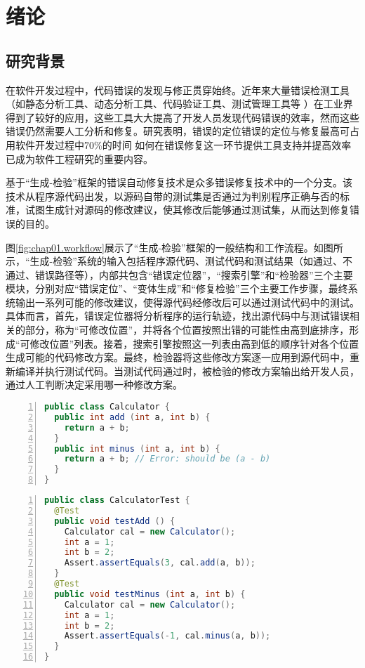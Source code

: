 \chapter{绪论}
\label{cha:intro}

\section{研究背景}%
在软件开发过程中，代码错误的发现与修正贯穿始终。近年来大量错误检测工具（如静态分析工具、动态分析工具、代码验证工具、测试管理工具等%
）在工业界得到了较好的应用，这些工具大大提高了开发人员发现代码错误的效率，然而这些错误仍然需要人工分析和修复。研究表明，错误的定位错误的定位与修复最高可占用软件开发过程中70\%的时间%
如何在错误修复这一环节提供工具支持并提高效率已成为软件工程研究的重要内容。

基于“生成-检验”框架的错误自动修复技术是众多错误修复技术中的一个分支。该技术从程序源代码出发，以源码自带的测试集是否通过为判别程序正确与否的标准，试图生成针对源码的修改建议，使其修改后能够通过测试集，从而达到修复错误的目的。

图\ref{fig:chap01.workflow}展示了“生成-检验”框架的一般结构和工作流程。如图所示，“生成-检验”系统的输入包括程序源代码、测试代码和测试结果（如通过、不通过、错误路径等），内部共包含“错误定位器”，“搜索引擎”和“检验器”三个主要模块，分别对应“错误定位”、“变体生成”和“修复检验”三个主要工作步骤，最终系统输出一系列可能的修改建议，使得源代码经修改后可以通过测试代码中的测试。具体而言，首先，错误定位器将分析程序的运行轨迹，找出源代码中与测试错误相关的部分，称为“可修改位置”，并将各个位置按照出错的可能性由高到底排序，形成“可修改位置”列表。接着，搜索引擎按照这一列表由高到低的顺序针对各个位置生成可能的代码修改方案。最终，检验器将这些修改方案逐一应用到源代码中，重新编译并执行测试代码。当测试代码通过时，被检验的修改方案输出给开发人员，通过人工判断决定采用哪一种修改方案。

\begin{lstlisting}[caption=“生成-检验”框架应用示例,frame=single,language=Java,numbers=left,basicstyle=\ttfamily\footnotesize]
public class Calculator {
  public int add (int a, int b) {
    return a + b;
  }
  public int minus (int a, int b) {
    return a + b; // Error: should be (a - b)
  }
}
\end{lstlisting}

\begin{lstlisting}[caption=“生成-检验”框架应用示例,frame=single,language=Java,numbers=left,basicstyle=\ttfamily\footnotesize]
public class CalculatorTest {  
  @Test
  public void testAdd () {
    Calculator cal = new Calculator();
    int a = 1;
    int b = 2;
    Assert.assertEquals(3, cal.add(a, b));
  }  
  @Test
  public void testMinus (int a, int b) {
    Calculator cal = new Calculator();
    int a = 1;
    int b = 2;
    Assert.assertEquals(-1, cal.minus(a, b));
  }  
}
\end{lstlisting}

